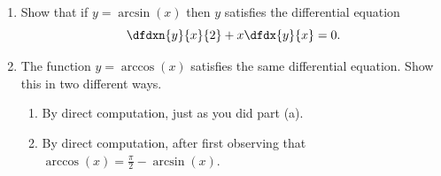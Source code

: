 




\begin{embeddedproblem-enumerate}
  \begin{enumerate}[label={\bf{}(\alph*)}]
  \item Show that if $y=\arcsin(x)$ then $y$ satisfies the
    differential equation
    $$
    \dfdxn{y}{x}{2}+x\dfdx{y}{x}=0.
    $$
  \item The function   $y=\arccos(x)$ satisfies the same differential
    equation. Show this in two different ways.
    \begin{enumerate}[label={\bf{}(\roman*)}]{}
    \item By direct computation, just as you did part (a).
    \item By direct computation, after first observing that $\arccos(x)=\frac\pi2-\arcsin(x)$.
    \end{enumerate}
  \end{enumerate}{}
\end{embeddedproblem-enumerate}



